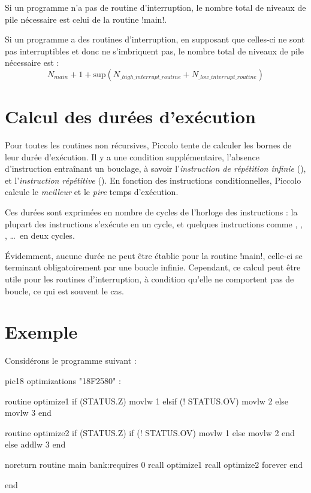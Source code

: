 Si un programme n'a pas de routine d'interruption, le nombre total de niveaux de pile nécessaire est celui de la routine \pic!main!.


Si un programme a des routines d'interruption, en supposant que celles-ci ne sont pas interruptibles et donc ne s'imbriquent pas, le nombre total de niveaux de pile nécessaire est :
\begin{equation*}
  N_{main} + 1 + \text{sup} \left(N_{\_high\_interrupt\_routine} + N_{\_low\_interrupt\_routine}\right)
\end{equation*}



\section{Calcul des durées d'exécution}

Pour toutes les routines non récursives, Piccolo tente de calculer les bornes de leur durée d'exécution. Il y a une condition supplémentaire, l'absence d'instruction entraînant un bouclage, à savoir l'\emph{instruction de répétition infinie} (), et l'\emph{instruction répétitive} (). En fonction des instructions conditionnelles, Piccolo calcule le \emph{meilleur} et le \emph{pire} temps d'exécution.

Ces durées sont exprimées en nombre de cycles de l'horloge des instructions : la plupart des instructions s'exécute en un cycle, et quelques instructions comme , , , \dots\ en deux cycles.

Évidemment, aucune durée ne peut être établie pour la routine \pic!main!, celle-ci se terminant obligatoirement par une boucle infinie. Cependant, ce calcul peut être utile pour les routines d'interruption, à condition qu'elle ne comportent pas de boucle, ce qui est souvent le cas.

\section{Exemple}

Considérons le programme suivant :

\begin{piccolo}
pic18 optimizations "18F2580" :

routine optimize1 {
  if (STATUS.Z)
    movlw 1
  elsif (! STATUS.OV)
    movlw 2
  else
    movlw 3
  end
}

routine optimize2 {
  if (STATUS.Z)
    if (! STATUS.OV)
      movlw 1
    else
      movlw 2
    end
  else
    addlw 3
  end
}

noreturn routine main bank:requires 0 {
  rcall optimize1
  rcall optimize2
  forever
  end
}

end
\end{piccolo}

